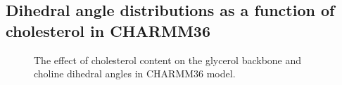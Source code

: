 \documentclass[pre,aps,floatfix,authordate1-4,twocolumn]{revtex4-1}
\begin{document}
\subsection{Dihedral angle distributions as a function of cholesterol in CHARMM36}
\begin{figure*}[]
  \centering
  \caption{\label{dihsCHOLcharmm}
    The effect of cholesterol content on the glycerol backbone and choline dihedral angles in CHARMM36 model.}
\end{figure*}


\onecolumngrid

 \listoftodos
\end{document}
